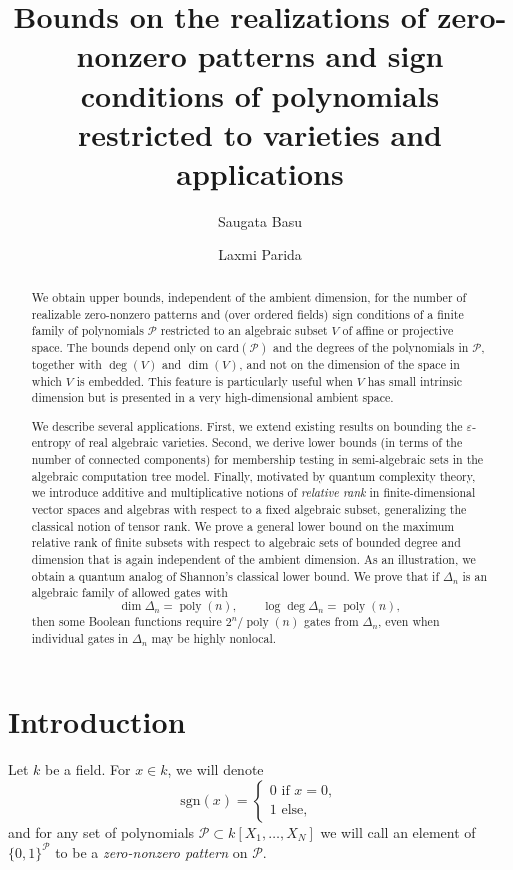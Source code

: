 \documentclass[10pt]{amsart}
\title
[Bounds on zero-nonzero patterns and sign conditions]
{
Bounds on the realizations of zero-nonzero patterns and 
sign conditions of polynomials restricted to varieties
and applications 
}
\author{Saugata Basu}
\author{Laxmi Parida}
\theoremstyle{definition}
\theoremstyle{remark}
\numberwithin{equation}{section}
\newcommand{\card}{\mathrm{card}}
\newcommand{\sgn}{\mathrm{sgn}}
\begin{document}

\begin{abstract}
We obtain upper bounds, independent of the ambient dimension, for the number of realizable
zero-nonzero patterns and (over ordered fields) sign conditions of a finite family of polynomials
$\mathcal P$ restricted to an algebraic subset $V$ of affine or projective space.
The bounds depend only on $\card(\mathcal P)$ and the degrees of the polynomials in $\mathcal P$,
together with $\deg(V)$ and $\dim(V)$, and not on the dimension of the space in which $V$ is embedded.
This feature is particularly useful when $V$ has small intrinsic dimension but is presented in a very
high-dimensional ambient space.

We describe several applications.  First, we extend existing results on bounding the
$\varepsilon$-entropy of real algebraic varieties.  Second, we derive lower bounds (in terms of the number
of connected components) for membership testing in semi-algebraic sets in the algebraic computation tree
model.  Finally, motivated by quantum complexity theory, we introduce additive and multiplicative notions
of \emph{relative rank} in finite-dimensional vector spaces and algebras with respect to a fixed algebraic
subset, generalizing the classical notion of tensor rank.  We prove a general lower bound on the maximum
relative rank of finite subsets with respect to algebraic sets of bounded degree and dimension that is
again independent of the ambient dimension.  
As an illustration, we obtain a quantum analog of Shannon's
classical lower bound.
We prove that
if \(\Delta_n\) is an algebraic family of allowed gates with
$$ \dim \Delta_n=\operatorname{poly}(n), \qquad \log\deg\Delta_n=\operatorname{poly}(n), $$
then some Boolean functions require \(2^n/\operatorname{poly}(n)\) gates from \(\Delta_n\), even when individual gates in \(\Delta_n\) may be highly nonlocal.
\end{abstract}

\maketitle
\tableofcontents

\section{Introduction}
Let $k$ be a field. For $x \in k$, we will denote 
\[
\sgn(x) = \begin{cases}
                0 \text{ if } x=0, \\
                1 \text{ else},
        \end{cases}
\]
and for any set of polynomials $\mathcal{P} \subset k[X_1,\ldots,X_N]$
we will call an element of $\{0,1\}^{\mathcal{P}}$ to be a 
\emph{zero-nonzero pattern} on $\mathcal{P}$.
\end{document}
